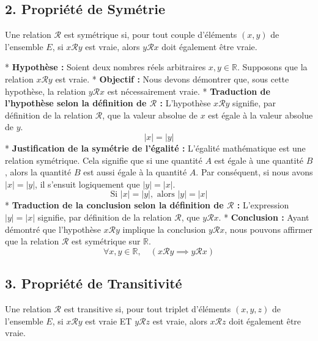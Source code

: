 \documentclass{report}
\begin{document}
\subsection*{2. Propriété de Symétrie}
Une relation $\mathcal{R}$ est symétrique si, pour tout couple d'éléments $(x, y)$ de l'ensemble $E$, si $x \mathcal{R} y$ est vraie, alors $y \mathcal{R} x$ doit également être vraie.

*   \textbf{Hypothèse :} Soient deux nombres réels arbitraires $x, y \in \mathbb{R}$. Supposons que la relation $x \mathcal{R} y$ est vraie.
*   \textbf{Objectif :} Nous devons démontrer que, sous cette hypothèse, la relation $y \mathcal{R} x$ est nécessairement vraie.
*   \textbf{Traduction de l'hypothèse selon la définition de $\mathcal{R}$ :} L'hypothèse $x \mathcal{R} y$ signifie, par définition de la relation $\mathcal{R}$, que la valeur absolue de $x$ est égale à la valeur absolue de $y$.
    $$ |x| = |y| $$
*   \textbf{Justification de la symétrie de l'égalité :} L'égalité mathématique est une relation symétrique. Cela signifie que si une quantité $A$ est égale à une quantité $B$, alors la quantité $B$ est aussi égale à la quantité $A$. Par conséquent, si nous avons $|x| = |y|$, il s'ensuit logiquement que $|y| = |x|$.
    $$ \text{Si } |x| = |y|, \text{ alors } |y| = |x| $$
*   \textbf{Traduction de la conclusion selon la définition de $\mathcal{R}$ :} L'expression $|y| = |x|$ signifie, par définition de la relation $\mathcal{R}$, que $y \mathcal{R} x$.
*   \textbf{Conclusion :} Ayant démontré que l'hypothèse $x \mathcal{R} y$ implique la conclusion $y \mathcal{R} x$, nous pouvons affirmer que la relation $\mathcal{R}$ est symétrique sur $\mathbb{R}$.
    $$ \forall x, y \in \mathbb{R}, \quad (x \mathcal{R} y \implies y \mathcal{R} x) $$

\subsection*{3. Propriété de Transitivité}
Une relation $\mathcal{R}$ est transitive si, pour tout triplet d'éléments $(x, y, z)$ de l'ensemble $E$, si $x \mathcal{R} y$ est vraie ET $y \mathcal{R} z$ est vraie, alors $x \mathcal{R} z$ doit également être vraie.
\end{document}

